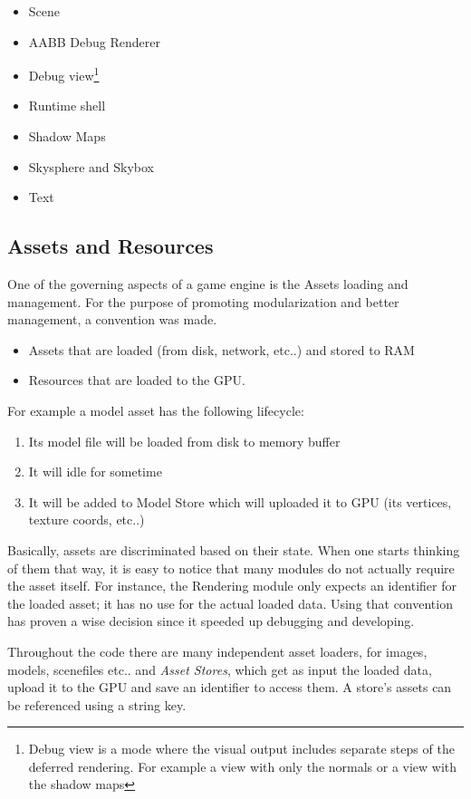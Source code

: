 \begin{itemize}
\item Scene
\item AABB Debug Renderer
\item Debug view\footnote{Debug view is a mode where the visual output includes separate steps
      of the deferred rendering. For example a view with only the normals or a view with the
      shadow maps}
\item Runtime shell
\item Shadow Maps
\item Skysphere and Skybox
\item Text
\end{itemize}

\subsection{Assets and Resources}
One of the governing aspects of a game engine is the Assets loading and management. For the
purpose of promoting modularization and better management, a convention was made.

\begin{itemize}
\item Assets that are loaded (from disk, network, etc..) and stored to RAM
\item Resources that are loaded to the GPU\@.
\end{itemize}

\noindent For example a model asset has the following lifecycle:

\begin{enumerate}
\item Its model file will be loaded from disk to memory buffer
\item It will idle for sometime
\item It will be added to Model Store which will uploaded it to GPU (its vertices, texture coords,
      etc..)
\end{enumerate}

Basically, assets are discriminated based on their state. When one starts thinking of them that
way, it is easy to notice that many modules do not actually require the asset itself. For
instance, the Rendering module only expects an identifier for the loaded asset; it has no use
for the actual loaded data. Using that convention has proven a wise decision since it speeded
up debugging and developing.

Throughout the code there are many independent asset loaders, for images, models, scenefiles etc..
and \textit{Asset Stores}, which get as input the loaded data, upload it to the GPU and save an
identifier to access them. A store's assets can be referenced using a string key.

